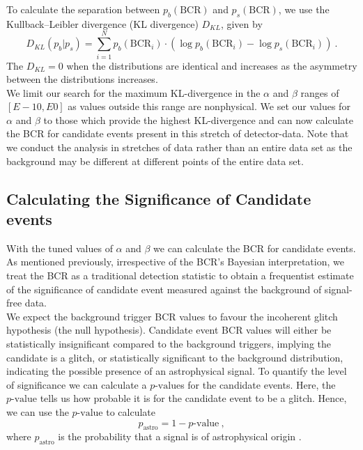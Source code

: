 \documentclass[%
preprint,
 amsmath,amssymb,
 aps,
]{revtex4}
\newcommand{\bcr}{{\sc BCR}\xspace}
\newcommand{\pastro}{{\sc $p_\text{astro}$}\xspace}
\begin{document}
To calculate the separation between $p_b(\text{BCR})$ and $p_s(\text{BCR})$, we use the Kullback--Leibler divergence (KL divergence) $D_{KL}$, given by
\begin{equation}
    D_{KL}(p_b | p_s) = \sum\limits_{i=1}^N p_b(\text{BCR}_i) \cdot (\log p_b(\text{BCR}_i) - \log p_s(\text{BCR}_i)) \ .
\end{equation}
The $D_{KL}=0$ when the distributions are identical and increases as the asymmetry between the distributions increases. \\

We limit our search for the maximum KL-divergence in the $\alpha$ and $\beta$ ranges of $[E-10, E0]$ as values outside this range are nonphysical. We set our values for $\alpha$ and $\beta$ to those which provide the highest KL-divergence and can now calculate the \bcr for candidate events present in this stretch of detector-data. Note that we conduct the analysis in stretches of data rather than an entire data set as the background may be different at different points of the entire data set.

\subsection{Calculating the Significance of Candidate events}
With the tuned values of $\alpha$ and $\beta$ we can calculate the \bcr for candidate events. As mentioned previously, irrespective of the \bcr's Bayesian interpretation, we treat the \bcr as a traditional detection statistic to obtain a frequentist estimate of the significance of candidate event measured against the background of signal-free data. \\

We expect the background trigger \bcr values to favour the incoherent glitch hypothesis (the null hypothesis). Candidate event \bcr values will either be statistically insignificant compared to the background triggers, implying the candidate is a glitch, or statistically significant to the background distribution, indicating the possible presence of an astrophysical signal. To quantify the level of significance we can calculate a $p\text{-value}$s for the candidate events. Here, the $p\text{-value}$ tells us how probable it is for the candidate event to be a glitch. Hence, we can use the $p\text{-value}$ to calculate
\begin{equation}
    p_\text{astro} = 1 - p\text{-value} \ ,
\end{equation}
where \pastro is the probability that a signal is of astrophysical origin \cite{pastro_1,pastro_2,pastro_3}.
\end{document}
